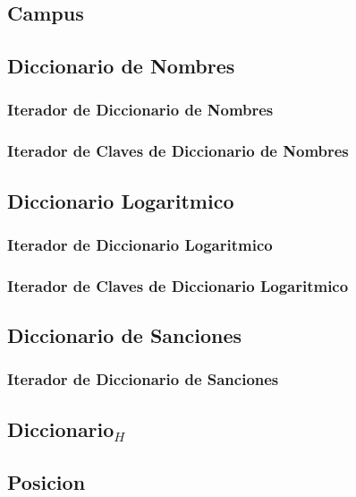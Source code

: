 \documentclass[a4paper,10pt, nofootinbib]{article}
\begin{document}
\subsection{Campus}


\subsection{Diccionario de Nombres}

\subsubsection{Iterador de Diccionario de Nombres}

\subsubsection{Iterador de Claves de Diccionario de Nombres}



\subsection{Diccionario Logaritmico}

\subsubsection{Iterador de Diccionario Logaritmico}

\subsubsection{Iterador de Claves de Diccionario Logaritmico}



\subsection{Diccionario de Sanciones}

\subsubsection{Iterador de Diccionario de Sanciones}


\subsection{Diccionario$_H$}


\subsection{Posicion}

\end{document}
